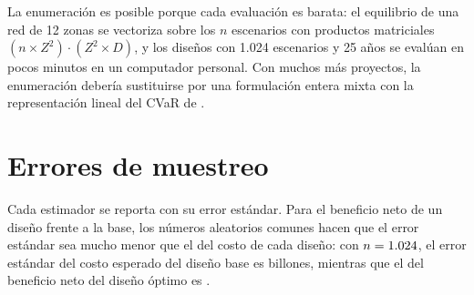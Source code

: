 \begin{remark}
La enumeración es posible porque cada evaluación es barata: el equilibrio de una red de 12 zonas se
vectoriza sobre los $n$ escenarios con productos matriciales $(n\times Z^2)\cdot(Z^2\times D)$, y los
\NDisenos{} diseños con 1.024 escenarios y 25 años se evalúan en pocos minutos en un computador
personal. Con muchos más proyectos, la enumeración debería sustituirse por una formulación entera mixta
con la representación lineal del CVaR de \citet{rockafellar2000}.
\end{remark}

\section{Errores de muestreo}

Cada estimador se reporta con su error estándar. Para el beneficio neto de un diseño frente a la base,
los números aleatorios comunes hacen que el error estándar sea mucho menor que el del costo de cada
diseño: con $n=1.024$, el error estándar del costo esperado del diseño base es \VPBaseEE{}
billones, mientras que el del beneficio neto del diseño óptimo es \BNOptimoEE.
